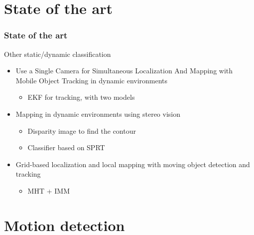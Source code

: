 \documentclass{beamer}
\begin{document}
\section{State of the art}

	\begin{frame}
		\frametitle{State of the art}
		
		\begin{block}{Other static/dynamic classification}
			\begin{itemize}
			\item Use a Single Camera for Simultaneous Localization And Mapping with  Mobile Object Tracking in dynamic environments \cite{Migliore_2009_ICRA}
				\begin{itemize}			
				\item EKF for tracking, with two models				
				\end{itemize}		
			\item Mapping in dynamic environments using stereo vision \cite{DBLP:conf/ivs/LategahnGHKE11}
				\begin{itemize}
				\item Disparity image to find the contour
				\item Classifier based on SPRT				
				\end{itemize}		
			\item Grid-based localization and local mapping with moving object detection and tracking \cite{Vu201158}
				\begin{itemize}			
				\item MHT + IMM			
				\end{itemize}	
			\end{itemize}		
		\end{block}
	\end{frame}


\section{Motion detection}
\end{document}
